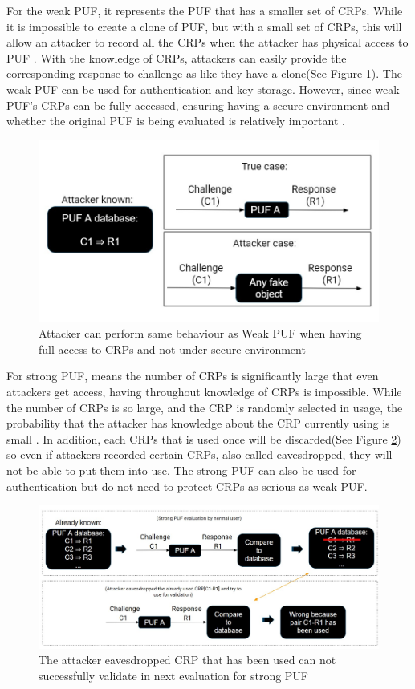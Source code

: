 For the weak PUF, it represents the PUF that has a smaller set of CRPs. While it is impossible to 
create a clone of PUF, but with a small set of CRPs, this will allow an attacker to record all the CRPs when the attacker has physical access to PUF \cite{Reference1}. With the knowledge of CRPs, attackers can easily provide the corresponding
response to challenge as like they have a clone(See Figure \ref{fig:figure2}). The weak PUF can be used for authentication and key storage. However, since weak PUF's CRPs can be fully accessed, ensuring having a secure environment and whether the original PUF is being evaluated is relatively important \cite{Reference1}.
\begin{figure}[htp]
    \centering
    \includegraphics[width=12cm]{figures/figure2.jpg}
    \caption{Attacker can perform same behaviour as Weak PUF when having full access to CRPs and not under secure environment}
    \label{fig:figure2}
    \end{figure}

For strong PUF, means the number of CRPs is significantly large that even attackers get access, having throughout knowledge of CRPs is impossible. While the number of CRPs is so large,
and the CRP is randomly selected in usage, the probability that the attacker has knowledge about the CRP currently using is small \cite{Reference1}. In addition, each CRPs that is used once will 
be discarded(See Figure \ref{fig:figure3}) so even if attackers recorded certain CRPs, also called eavesdropped, they will not be able to put them into use. The strong PUF can also be used for authentication but do not need to protect CRPs
as serious as weak PUF.

\begin{figure}[htp]
    \centering
    \includegraphics[width=18cm]{figures/figure3.jpg}
    \caption{The attacker eavesdropped CRP that has been used can not successfully validate in next evaluation for strong PUF}
    \label{fig:figure3}
    \end{figure}

